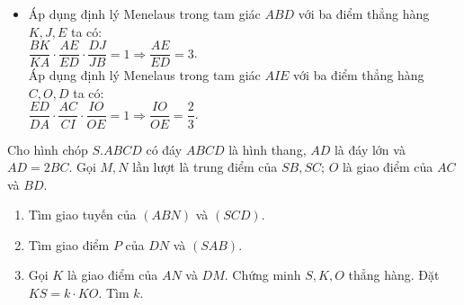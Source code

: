 \begin{bt}
\begin{bt}
{\begin{enumerate}
\begin{itemize}
				Áp dụng định lý Menelaus trong tam giác $DBC$ với ba điểm thẳng hàng $J, O, F$ ta có$\colon$\\
				$\dfrac{DJ}{JB}\cdot \dfrac{BF}{FC}\cdot \dfrac{CO}{OD}= 1 \Rightarrow \dfrac{CO}{OD}=\dfrac{3}{2}$.\\
				Vậy $\dfrac{OC}{OD}=\dfrac{3}{2}$.
				\item 	Áp dụng định lý Menelaus trong tam giác $ABD$ với ba điểm thẳng hàng $K, J, E$ ta có$\colon$\\
				$\dfrac{BK}{KA}\cdot \dfrac{AE}{ED}\cdot \dfrac{DJ}{JB}= 1 \Rightarrow \dfrac{AE}{ED}=3$.\\
				Áp dụng định lý Menelaus trong tam giác $AIE$ với ba điểm thẳng hàng $C, O, D$ ta có$\colon$\\
				$\dfrac{ED}{DA}\cdot \dfrac{AC}{CI} \cdot \dfrac{IO}{OE}= 1 \Rightarrow \dfrac{IO}{OE}=\dfrac{2}{3}$.\\
				
			\end{itemize}	
		\end{enumerate}
	}
\end{bt}

\begin{bt}%
	Cho hình chóp $S.ABCD$ có đáy $ABCD$ là hình thang, $AD$ là đáy lớn và $AD=2BC$. Gọi $M, N$ lần lượt là trung điểm của $SB, SC$; $O$ là giao điểm của $AC$ và $BD$.
	\begin{enumerate}
		\item Tìm giao tuyến của $(ABN)$ và $(SCD)$.
		\item Tìm giao điểm $P$ của $DN$ và $(SAB)$.
		\item Gọi $K$ là giao điểm của $AN$ và $DM$. Chứng minh $S, K, O$ thẳng hàng. Đặt $KS=k\cdot KO$. Tìm $k$.
	\end{enumerate}
\end{bt}
\end{bt}
